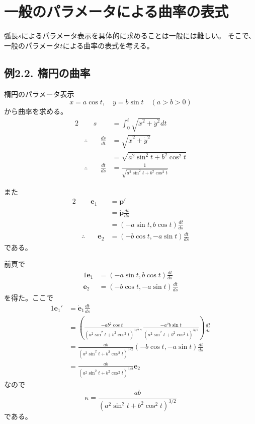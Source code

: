 \documentclass[a4j,disablejfam,dvipdfmx,papersize,slide,uplatex,21pt]{jsarticle}
\begin{document}
\section{一般のパラメータによる曲率の表式}
弧長$s$によるパラメータ表示を具体的に求めることは一般には難しい。
そこで、一般のパラメータ$t$による曲率の表式を考える。

\newpage
\subsection*{例2.2. 楕円の曲率}
楕円のパラメータ表示
\begin{equation}
    x = a \cos t,\quad y = b \sin t \quad (a > b > 0)
\end{equation}
から曲率を求める。
\begin{alignat}{2}
    &&s &= \int_0^t \sqrt{\dot{x}^2 + \dot{y}^2} dt \\
    &\therefore& \quad \frac{ds}{dt} &= \sqrt{\dot{x}^2 + \dot{y}^2} \\
        &&&= \sqrt{a^2 \sin^2 t + b^2 \cos^2 t} \\
    &\therefore& \quad \frac{dt}{ds} &= \frac{1}{\sqrt{a^2 \sin^2 t + b^2 \cos^2 t}}
\end{alignat}

\newpage
また
\begin{alignat}{2}
    &&\bm{e}_1 &= \bm{p}' \\
        &&&= \dot{\bm{p}} \frac{dt}{ds} \\
        &&&= (-a \sin t, b \cos t) \frac{dt}{ds} \\
    &\therefore& \quad \bm{e}_2 &= (-b \cos t, -a \sin t) \frac{dt}{ds}
\end{alignat}
である。

\newpage
前頁で
\begin{alignat}{1}
    \bm{e}_1 &= (-a \sin t, b \cos t) \frac{dt}{ds} \\
    \bm{e}_2 &= (-b \cos t, -a \sin t) \frac{dt}{ds}
\end{alignat}
を得た。ここで
\begin{alignat}{1}
    \bm{e}_1' &= \dot{\bm{e}}_1 \frac{dt}{ds} \\
        &= \left(
            \frac{-ab^2 \cos t}{(a^2 \sin^2 t + b^2 \cos^2 t)^{3/2}},
            \frac{-a^2b \sin t}{(a^2 \sin^2 t + b^2 \cos^2 t)^{3/2}}
        \right) \frac{dt}{ds} \\
        &= \frac{ab}{(a^2 \sin^2 t + b^2 \cos^2 t)^{3/2}}
            (-b \cos t, -a \sin t) \frac{dt}{ds} \\
        &= \frac{ab}{(a^2 \sin^2 t + b^2 \cos^2 t)^{3/2}}
            \bm{e}_2
\end{alignat}
なので
\begin{equation}
    \kappa = \frac{ab}{(a^2 \sin^2 t + b^2 \cos^2 t)^{3/2}}
\end{equation}
である。
\end{document}
